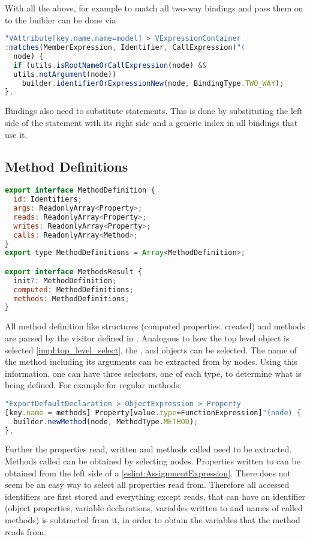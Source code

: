 With all the above, for example to match all two-way bindings and pass them on to the builder can be done via 
\begin{lstlisting}[language=JavaScript]
"VAttribute[key.name.name=model] > VExpressionContainer
:matches(MemberExpression, Identifier, CallExpression)"(
  node) {
  if (utils.isRootNameOrCallExpression(node) && 
  utils.notArgument(node))
    builder.identifierOrExpressionNew(node, BindingType.TWO_WAY);
},
\end{lstlisting}


Bindings also need to substitute  statements. This is done by substituting the left side of the  statement with its right side and a generic index in all bindings that use it.

\subsection{Method Definitions}

\begin{lstlisting}[language=JavaScript]
export interface MethodDefinition {
  id: Identifiers;
  args: ReadonlyArray<Property>;
  reads: ReadonlyArray<Property>;
  writes: ReadonlyArray<Property>;
  calls: ReadonlyArray<Method>;
}
export type MethodDefinitions = Array<MethodDefinition>;

export interface MethodsResult {
  init?: MethodDefinition;
  computed: MethodDefinitions;
  methods: MethodDefinitions;
}
\end{lstlisting}
All method definition like structures (computed properties, created) and methods are parsed by the visitor defined in .
Analogous to how the top level  object is selected \ref{impl:top_level_select}, the ,  and  objects can be selected. 
The name of the method including its arguments can be extracted from by  nodes. Using this information, one can have three selectors, one of each type, to determine what is being defined. For example for regular methods:
 
\begin{lstlisting}[language=JavaScript]
"ExportDefaultDeclaration > ObjectExpression > Property
[key.name = methods] Property[value.type=FunctionExpression]"(node) {
  builder.newMethod(node, MethodType.METHOD);
},
\end{lstlisting}
Further the properties read, written and methods called need to be extracted. Methods called can be obtained by selecting  nodes. Properties written to can be obtained from the left side of a  \ref{eslint:AssignmentExpression}.
There does not seem be an easy way to select all properties read from. Therefore all accessed identifiers are first stored and everything except reads, that can have an identifier (object properties, variable declarations, variables written to and names of called methods) is subtracted from it, in order to obtain the variables that the method reads from.

